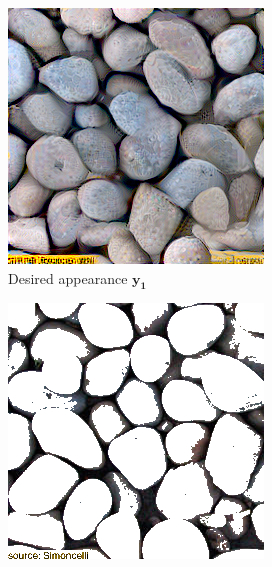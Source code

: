 \begin{figure}[ht]
    \centering    
    \begin{subfigure}{\textwidth}
        \centering
        \begin{subfigure}{0.2\textwidth}
            \centering
            \includegraphics[width=\textwidth]{images/01-pixels_vs_stats-pixels_target.jpg}
            \caption*{Desired appearance \(\bm{y_1}\)}
            \vspace*{5mm}
            \label{fig:intro_pixels_vs_stats-pixels_target}
        \end{subfigure}
        \hfill
        \begin{subfigure}{0.2\textwidth}
            \centering
            \includegraphics[width=\textwidth]{images/01-pixels_vs_stats-bg.jpg}

\end{subfigure}
\end{subfigure}
\end{figure}
